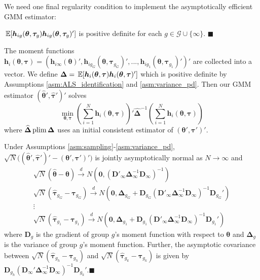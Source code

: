 \documentclass[12pt]{article}
\begin{document}
We need one final regularity condition to implement the asymptotically efficient GMM estimator:
\begin{assumption}\label{asm:variance_pd}
  $\expec{\bm h_{ig}(\bm{\theta}, \bm \tau_g) \bm h_{ig}(\bm{\theta}, \bm \tau_g)'}$ is positive definite for each $g \in \mathcal{G} \cup \{\infty\}$. $\blacksquare$
\end{assumption}

The moment functions $\bm h_i(\bm{\theta}, \bm \tau) = (\bm h_{i\infty}(\bm{\theta})', \bm h_{ig_G}(\bm{\theta}, \bm \tau_{g_G})',...,\bm h_{ig_1}(\bm{\theta}, \bm \tau_{g_1})')'$ are collected into a vector. We define $\bm \Delta = \expec{\bm h_i(\bm{\theta}, \bm \tau) \bm h_i(\bm{\theta}, \bm \tau)'}$ which is positive definite by Assumptions \ref{asm:ALS_identification} and \ref{asm:variance_pd}. Then our GMM estimator $(\widehat{ \bm{\theta}}', \widehat{ \bm \tau}')'$ solves
\begin{equation}\label{eq:minimization_problem}
  \min_{\bm{\theta}, \bm \tau} \left( \sum_{i = 1}^N \bm h_i(\bm{\theta}, \bm \tau) \right)' \widehat{\bm \Delta}^{-1} \left( \sum_{i = 1}^N \bm h_i(\bm{\theta}, \bm \tau) \right)
\end{equation}
where $\widehat{\bm \Delta} \operatorname{plim} \bm \Delta$ uses an initial consistent estimator of $(\bm{\theta}', \bm \tau')'$. 

\begin{theorem}\label{theorem:asymptotic_distribution}
  Under Assumptions \ref{asm:sampling}-\ref{asm:variance_pd}, $\sqrt{N}\big((\widehat{\bm{\theta}}', \widehat{\bm \tau}')' - (\bm{\theta}', \bm \tau')'\big)$ is jointly asymptotically normal as $N \rightarrow \infty$ and
  \begin{gather*}
    \sqrt{N}(\widehat{\bm{\theta}} - \bm{\theta}) \stackrel{d}{\rightarrow} N \left( \bm 0, \left( \bm D'_{\infty} \bm \Delta_{\infty}^{-1} \bm D_{\infty} \right)^{-1} \right) \\
    \sqrt{N}(\widehat{\bm \tau}_{g_G} - \bm \tau_{g_G}) \stackrel{d}{\rightarrow} N \left( \bm 0, \bm \Delta_{g_G} + \bm D_{g_G} \left( \bm D'_{\infty} \bm \Delta_{\infty}^{-1} \bm D_{\infty} \right)^{-1} \bm D_{g_G}'  \right)\\
    \vdots\\
    \sqrt{N}(\widehat{\bm \tau}_{g_1} - \bm \tau_{g_1}) \stackrel{d}{\rightarrow} N \left( \bm 0, \bm \Delta_{g_1} + \bm D_{g_1} \left( \bm D'_{\infty} \bm \Delta_{\infty}^{-1} \bm D_{\infty} \right)^{-1} \bm D_{g_1}' \right)
  \end{gather*}
where $\bm D_g$ is the gradient of group $g$'s moment function with respect to $\bm{\theta}$ and $\bm \Delta_g$ is the variance of group $g$'s moment function. Further, the asymptotic covariance between $\sqrt{N}(\widehat{\bm \tau}_{g_h} - \bm \tau_{g_h})$ and $\sqrt{N}(\widehat{\bm \tau}_{g_k} - \bm \tau_{g_k})$ is given by $\bm D_{g_h} (\bm D_{\infty}' \bm \Delta_{\infty}^{-1} \bm D_{\infty})^{-1} \bm D_{g_k}'$.$\blacksquare$
\end{theorem}
\end{document}
